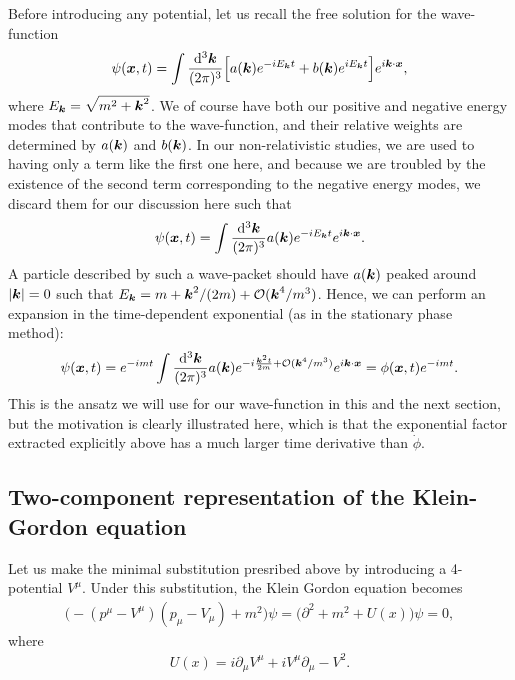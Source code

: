 Before introducing any potential, let us recall the free solution for the wave-function
\begin{align}
    \psi(\vb*{x},t) = \int \frac{\dd[3]{\vb*{k}}}{(2 \pi)^3} \Big[ a(\vb*{k}) e^{-i E_{\vb*{k}} t} + b(\vb*{k}) e^{i E_{\vb*{k}} t} \Big] e^{i \vb*{k} \cdot \vb*{x}}
,\end{align}
where $E_{\vb*{k}} = \sqrt{m^2 + \vb*{k}^2}$.
We of course have both our positive and negative energy modes that contribute to the wave-function, and their relative weights are determined by $a(\vb*{k})$ and $b(\vb*{k})$.
In our non-relativistic studies, we are used to having only a term like the first one here, and because we are troubled by the existence of the second term corresponding to the negative energy modes, we discard them for our discussion here such that 
\begin{align}
    \psi(\vb*{x},t) = \int \frac{\dd[3]{\vb*{k}}}{(2 \pi)^3} a(\vb*{k}) e^{-i E_{\vb*{k}} t} e^{i \vb*{k} \cdot \vb*{x}}
.\end{align}
A particle described by such a wave-packet should have $a(\vb*{k})$ peaked around $|\vb*{k}| = 0$ such that $E_{\vb*{k}} = m + \vb*{k}^2/(2m) + \mathcal{O}(\vb*{k}^{4}/m^3)$.
Hence, we can perform an expansion in the time-dependent exponential (as in the stationary phase method):
\begin{align}
    \psi(\vb*{x},t) = e^{-i m t} \int \frac{\dd[3]{\vb*{k}}}{(2 \pi)^3} a(\vb*{k}) e^{-i \frac{\vb*{k}^2 t}{2m} + \mathcal{O}(\vb*{k}^{4}/m^3)} e^{i \vb*{k} \cdot \vb*{x}} = \phi(\vb*{x},t) e^{-i m t}
.\end{align}
This is the ansatz we will use for our wave-function in this and the next section, but the motivation is clearly illustrated here, which is that the exponential factor extracted explicitly above has a much larger time derivative than $\dot{\phi}$.


\subsection{Two-component representation of the Klein-Gordon equation}

Let us make the minimal substitution presribed above by introducing a 4-potential $V^{\mu}$.
Under this substitution, the Klein Gordon equation becomes
\begin{align}
    \Big( - ( p^{\mu} - V^{\mu} ) ( p_{\mu} - V_{\mu} ) + m^2 \Big) \psi = \Big( \partial^2 + m^2 + U(x) \Big) \psi = 0
,\end{align}
where 
\begin{align}
    U(x) = i \partial_{\mu} V^{\mu} + i V^{\mu} \partial_{\mu} - V^2
.\end{align}

